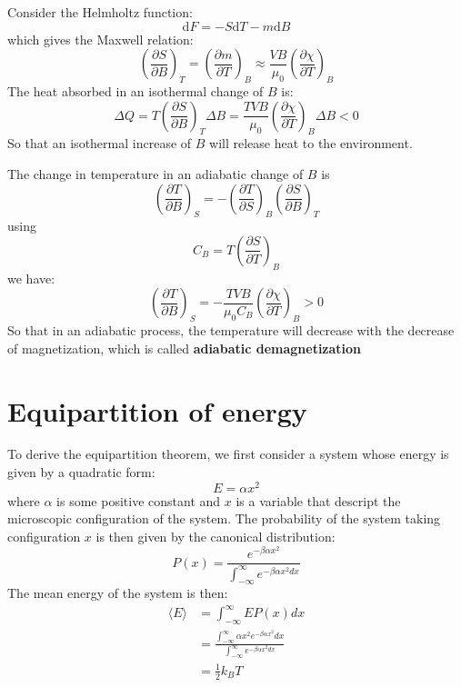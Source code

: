 \documentclass{article}
\newcommand{\pfrac}[2]{\frac{\partial #1}{\partial #2}}
\newcommand{\dnor}{\text{d}}
\begin{document}
Consider the Helmholtz function:
\begin{equation}
    \dnor F = - S \dnor T - m \dnor B
\end{equation}
which gives the Maxwell relation:
\begin{equation}
    \left(\pfrac{S}{B}\right)_T = \left(\pfrac{m}{T}\right)_B 
    \approx \frac{VB}{\mu_0} \left(\pfrac{\chi}{T}\right)_B
\end{equation}
The heat absorbed in an isothermal change of $B$ is:
\begin{equation}
    \Delta Q = T \left(\pfrac{S}{B}\right)_T \Delta B
    = \frac{TVB}{\mu_0} \left(\pfrac{\chi}{T}\right)_B \Delta B < 0
\end{equation}
So that an isothermal increase of $B$ will 
release heat to the environment.

The change in temperature in an adiabatic change of $B$ is 
\begin{equation}
    \left( \pfrac{T}{B} \right)_S = - \left( \pfrac{T}{S} \right)_B \left( \pfrac{S}{B} \right)_T
\end{equation}
using 
\begin{equation}
    C_B = T \left( \pfrac{S}{T} \right)_B    
\end{equation}
we have:
\begin{equation}
    \left( \pfrac{T}{B} \right)_S = - \frac{TVB}{\mu_0 C_B} \left(\pfrac{\chi}{T}\right)_B > 0
\end{equation}
So that in an adiabatic process, the temperature will decrease with the decrease of magnetization,
which is called \textbf{adiabatic demagnetization}

\section{Equipartition of energy}
To derive the equipartition theorem, we first consider a system
whose energy is given by a quadratic form:
\begin{equation}
    E = \alpha x^2
\end{equation}
where $\alpha$ is some positive constant and $x$ is a variable
that descript the microscopic configuration of the system. The 
probability of the system taking configuration $x$ is then 
given by the canonical distribution:
\begin{equation}
    P(x) = \frac{e^{-\beta \alpha x^2}}{\int_{-\infty}^{\infty} e^{-\beta \alpha x^2 dx}}
\end{equation}
The mean energy of the system is then:
\begin{align}
    \langle E \rangle &= \int_{-\infty}^{\infty} E P(x) dx \\
        & = \frac{\int_{-\infty}^{\infty} \alpha x^2 e^{-\beta \alpha x^2} dx}{\int_{-\infty}^{\infty} e^{-\beta \alpha x^2 dx}} \\
        & = \frac{1}{2} k_B T
\end{align}
\end{document}
